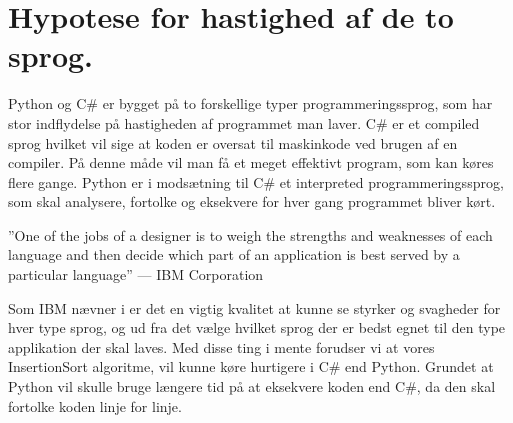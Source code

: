 \documentclass[class=report, crop=false]{standalone}
\begin{document}
    \section{Hypotese for hastighed af de to sprog.}
        Python og C\# er bygget på to forskellige typer programmeringssprog, som har stor indflydelse på hastigheden af programmet man laver. C\# er et compiled sprog hvilket vil sige at koden er oversat til maskinkode ved brugen af en compiler. På denne måde vil man få et meget effektivt program, som kan køres flere gange. Python er i modsætning til C\# et interpreted programmeringssprog, som skal analysere, fortolke og eksekvere for hver gang programmet bliver kørt.
        \begin{displayquote}
            ”One of the jobs of a designer is to weigh the strengths and weaknesses of each language and then decide which part of an application is best served by a particular language” --- IBM Corporation\cite{ibmcomvsint}
        \end{displayquote}
        Som IBM nævner i \cite{ibmcomvsint} er det en vigtig kvalitet at kunne se styrker og svagheder for hver type sprog, og ud fra det vælge hvilket sprog der er bedst egnet til den type applikation der skal laves. Med disse ting i mente forudser vi at vores InsertionSort algoritme, vil kunne køre hurtigere i C\# end Python. Grundet at Python vil skulle bruge længere tid på at eksekvere koden end C\#, da den skal fortolke koden linje for linje.
\end{document}
